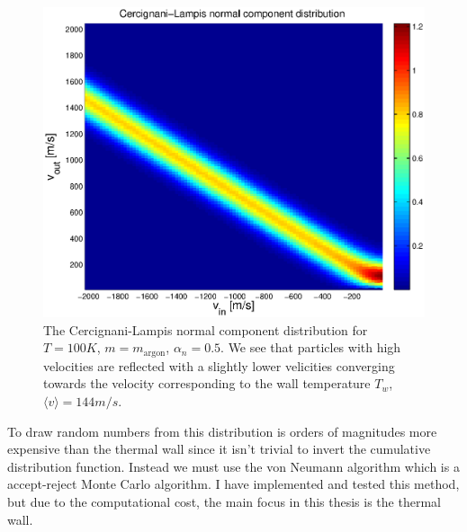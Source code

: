 \begin{figure}[h]
\begin{center}
\includegraphics[width=\textwidth, trim=0cm 0cm 0cm 0cm, clip]{DSMC/figures/cercignani-lampis.eps}
\end{center}
\caption{The Cercignani-Lampis normal component distribution for $T=100K$, $m=m_{\text{argon}}$, $\alpha_n=0.5$. We see that particles with high velocities are reflected with a slightly lower velicities converging towards the velocity corresponding to the wall temperature $T_w$, $\langle v \rangle = 144m/s$.}
\label{fig:cercignani_lampis}
\end{figure}
To draw random numbers from this distribution is orders of magnitudes more expensive than the thermal wall since it isn't trivial to invert the cumulative distribution function. Instead we must use the von Neumann algorithm which is a accept-reject Monte Carlo algorithm\cite{allen1989computer}. I have implemented and tested this method, but due to the computational cost, the main focus in this thesis is the thermal wall. 